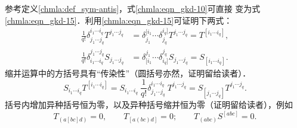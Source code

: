 参考定义\ref{chmla:def_sym-antis}，式\eqref{chmla:eqn_gkd-10}可直接
变为式\eqref{chmla:eqn_gkd-15}．利用\eqref{chmla:eqn_gkd-15}可证明下两式：
\begin{align}
    \frac{1}{q!}\delta^{i_1 \cdots i_q}_{j_1 \cdots j_q} T^{j_1 \cdots j_q}
    &=\delta^{\lbrack i_1}_{j_1} \cdots \delta^{i_q \rbrack}_{j_q} T^{j_1 \cdots j_q}
    =T^{[i_1 \cdots i_q]} , \label{chmla:eqn_gkd-20} \\
    \frac{1}{q!}\delta_{i_1 \cdots i_q}^{j_1 \cdots j_q} S_{j_1 \cdots j_q}
    &=\delta_{\lbrack i_1}^{j_1} \cdots \delta_{i_q \rbrack}^{j_q} S_{j_1 \cdots j_q}
    =S_{[i_1 \cdots i_q]}  .  \label{chmla:eqn_gkd-25}
\end{align}
缩并运算中的方括号具有“传染性”（圆括号亦然，证明留给读者）．
\begin{equation}\label{chmla:eqn_gkd-30}
    S_{i_1 \cdots i_q} T^{[i_1 \cdots i_q]} = S_{i_1 \cdots i_q} \
    \frac{1}{q!}\delta^{i_1 \cdots i_q}_{j_1 \cdots j_q} \ T^{j_1 \cdots j_q}
    = S_{[j_1 \cdots j_q]} T^{j_1 \cdots j_q} .
\end{equation}
括号内增加异种括号恒为零，以及异种括号缩并恒为零（证明留给读者），例如
\begin{equation}\label{chmla:eqn_gkd-35}
    T_{(a[bc]d)} =0, \qquad  T_{[a(bc)d]} =0 ; \qquad
    T_{(abc)} S^{[abc]} =0 .
\end{equation}

